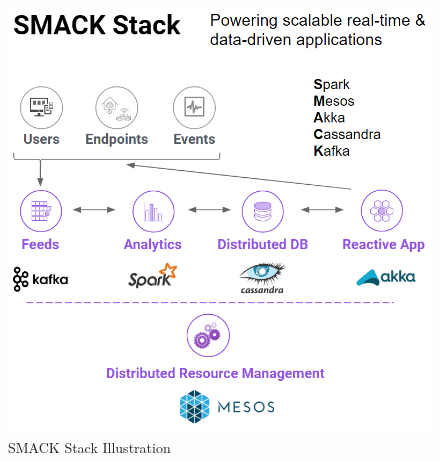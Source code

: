 \begin{figure}[!htbp]
  \centering
  \includegraphics[keepaspectratio=true,scale=0.4]{img/smack_stack}
    \caption{SMACK Stack Illustration \cite{mesosphere}}
  \label{fig:smack_stack}
\end{figure}

